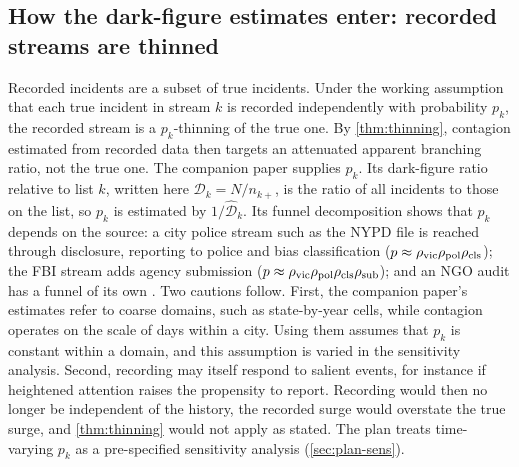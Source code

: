 \subsection{How the dark-figure estimates enter: recorded streams are thinned}\label{sec:data-thinning}

Recorded incidents are a subset of true incidents. Under the working
assumption that each true incident in stream $k$ is recorded independently
with probability $p_k$, the recorded stream is a $p_k$-thinning of the true
one. By \cref{thm:thinning}, contagion estimated from recorded data then
targets an attenuated apparent branching ratio, not the true one. The
companion paper supplies $p_k$. Its dark-figure ratio relative to list $k$,
written here $\mathcal D_k=N/n_{k+}$, is the ratio of all incidents to those on the
list, so $p_k$ is estimated by $1/\widehat{\mathcal D}_k$. Its funnel
decomposition shows that $p_k$ depends on the source: a city police stream
such as the NYPD file is reached through disclosure, reporting to police and
bias classification ($p \approx \rho_{\mathrm{vic}}\rho_{\mathrm{pol}}\rho_{\mathrm{cls}}$); the FBI stream adds
agency submission ($p \approx \rho_{\mathrm{vic}}\rho_{\mathrm{pol}}\rho_{\mathrm{cls}}\rho_{\mathrm{sub}}$); and an NGO audit has a
funnel of its own \citep{kornsteinlab2026darkfigure}. Two cautions follow.
First, the companion paper's estimates refer to coarse domains, such as
state-by-year cells, while
contagion operates on the scale of days within a city. Using them assumes
that $p_k$ is constant within a domain, and this assumption is varied in the
sensitivity analysis. Second, recording may itself respond to salient
events, for instance if heightened attention raises the propensity to report.
Recording would then no longer be independent of the history, the recorded
surge would overstate the true surge, and \cref{thm:thinning} would not
apply as stated. The plan treats time-varying $p_k$ as a pre-specified
sensitivity analysis (\cref{sec:plan-sens}).
